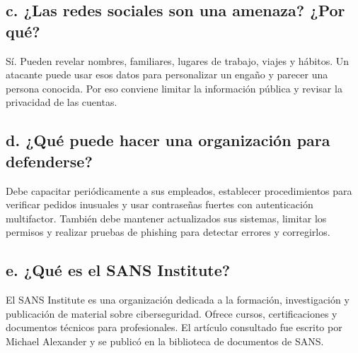 \documentclass[11pt,a4paper]{article}
\begin{document}
\subsection*{c. ¿Las redes sociales son una amenaza? ¿Por qué?}

Sí. Pueden revelar nombres, familiares, lugares de trabajo, viajes y hábitos.
Un atacante puede usar esos datos para personalizar un engaño y parecer una
persona conocida. Por eso conviene limitar la información pública y revisar la
privacidad de las cuentas.

\subsection*{d. ¿Qué puede hacer una organización para defenderse?}

Debe capacitar periódicamente a sus empleados, establecer procedimientos para
verificar pedidos inusuales y usar contraseñas fuertes con autenticación
multifactor. También debe mantener actualizados sus sistemas, limitar los
permisos y realizar pruebas de phishing para detectar errores y corregirlos.

\subsection*{e. ¿Qué es el SANS Institute?}

El SANS Institute es una organización dedicada a la formación, investigación
y publicación de material sobre ciberseguridad. Ofrece cursos, certificaciones
y documentos técnicos para profesionales. El artículo consultado fue escrito
por Michael Alexander y se publicó en la biblioteca de documentos de SANS.
\end{document}
